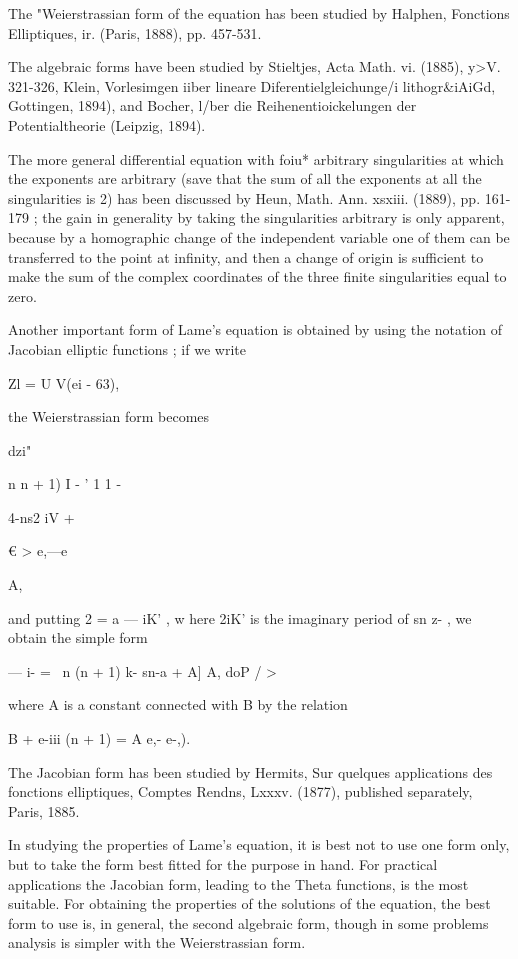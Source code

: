 {{{{The "Weierstrassian form of the equation has been studied by Halphen, Fonctions 
Elliptiques, ir. (Paris, 1888), pp. 457-531. 

The algebraic forms have been studied by Stieltjes, Acta Math. vi. (1885), y>V. 321-326, 
Klein, Vorlesimgen iiber lineare Diferentielgleichunge/i  lithogr\&iAiGd, Gottingen, 1894), and 
Bocher, l/ber die Reihenentioickelungen der Potentialtheorie (Leipzig, 1894). 

The more general differential equation with foiu* arbitrary singularities at which the 
exponents are arbitrary (save that the sum of all the exponents at all the singularities is 2) 
has been discussed by Heun, Math. Ann. xsxiii. (1889), pp. 161-179 ; the gain in generality 
by taking the singularities arbitrary is only apparent, because by a homographic change 
of the independent variable one of them can be transferred to the point at infinity, and 
then a change of origin is sufficient to make the sum of the complex coordinates of the 
three finite singularities equal to zero. 

Another important form of Lame's equation is obtained by using the 
notation of Jacobian elliptic functions ; if we write 

Zl = U V(ei - 63), 

the Weierstrassian form becomes 



dzi" 



n  n + 1) I - ' 
1 1 - 



4-ns2 iV + 



€ > e,—e 



A, 



and putting 2  = a — iK' , w here 2iK' is the imaginary period of sn z-  , we 
obtain the simple form 

— i- = \ n (n + 1) k- sn-a + A] A, 
doP   / > 

where A is a constant connected with B by the relation 

B + e-iii (n + 1) = A e,- e-,). 

The Jacobian form has been studied by Hermits, Sur quelques applications des fonctions 
elliptiques, Comptes Rendns, Lxxxv. (1877), published separately, Paris, 1885. 

In studying the properties of Lame's equation, it is best not to use one 
form only, but to take the form best fitted for the purpose in hand. For 
practical applications the Jacobian form, leading to the Theta functions, is 
the most suitable. For obtaining the properties of the solutions of the 
equation, the best form to use is, in general, the second algebraic form, 
though in some problems analysis is simpler with the Weierstrassian form. 



}}}}
